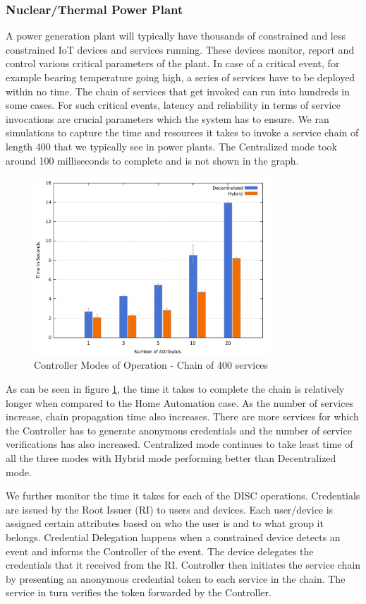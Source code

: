 \documentclass[journal]{IEEEtran}
\begin{document}
\subsubsection{Nuclear/Thermal Power Plant}
A power generation plant will typically have thousands of constrained and less constrained IoT devices and services running. These devices monitor, report and control various critical parameters of the plant. In case of a critical event, for example bearing temperature going high, a series of services have to be deployed within no time. The chain of services that get invoked can run into hundreds in some cases. For such critical events, latency and reliability in terms of service invocations are crucial parameters which the system has to ensure. We ran simulations to capture the time and resources it takes to invoke a service chain of length 400 that we typically see in power plants. The Centralized mode took around 100 milliseconds to complete and is not shown in the graph.

\begin{figure}[htbp]
\centerline{\includegraphics[width=3.5in]{500services.pdf}}
\caption{Controller Modes of Operation - Chain of 400 services}
\label{fig:cont_power}
\end{figure}

As can be seen in figure \ref{fig:cont_power}, the time it takes to complete the chain is relatively longer when compared to the Home Automation case. As the number of services increase, chain propagation time also increases. There are more services for which the Controller has to generate anonymous credentials and the number of service verifications has also increased. Centralized mode continues to take least time of all the three modes with Hybrid mode performing better than Decentralized mode.

We further monitor the time it takes for each of the DISC operations. Credentials are issued by the Root Issuer (RI) to users and devices. Each user/device is assigned certain attributes based on who the user is and to what group it belongs. Credential Delegation happens when a constrained device detects an event and informs the Controller of the event. The device delegates the credentials that it received from the RI. Controller then initiates the service chain by presenting an anonymous credential token to each service in the chain. The service in turn verifies the token forwarded by the Controller.
\end{document}
